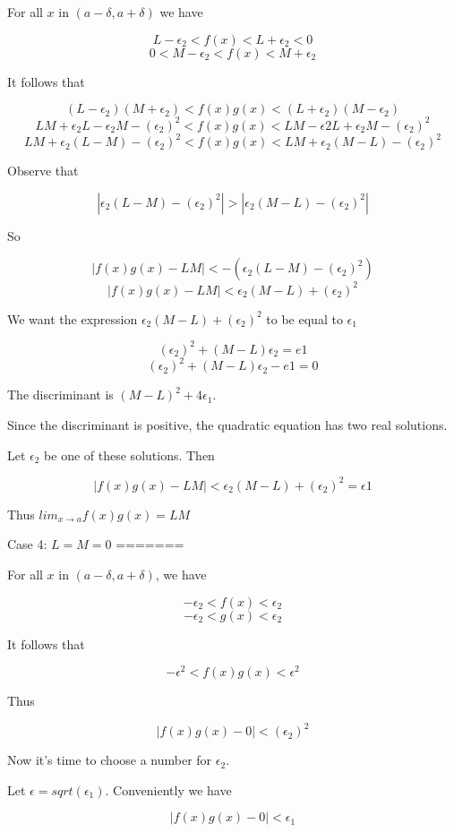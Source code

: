 For all $x$ in $(a - \delta, a + \delta)$ we have

    $$ L - \epsilon_2 < f(x) < L + \epsilon_2 < 0 $$
    $$ 0 < M - \epsilon_2 < f(x) < M + \epsilon_2 $$

It follows that

	$$ (L - \epsilon_2)(M + \epsilon_2) < f(x)g(x) < (L + \epsilon_2)(M - \epsilon_2) $$
	$$ LM + \epsilon_2L - \epsilon_2M - (\epsilon_2)^2 < f(x)g(x) < LM - \epsilon2L + \epsilon_2M - (\epsilon_2)^2 $$
	$$ LM + \epsilon_2(L - M) - (\epsilon_2)^2 < f(x)g(x) < LM + \epsilon_2(M - L) - (\epsilon_2)^2 $$

Observe that

    $$ |\epsilon_2(L - M) - (\epsilon_2)^2| > |\epsilon_2(M - L) - (\epsilon_2)^2| $$

So

    $$ |f(x)g(x) - LM| < -(\epsilon_2(L - M) - (\epsilon_2)^2) $$
    $$ |f(x)g(x) - LM| < \epsilon_2(M - L) + (\epsilon_2)^2 $$

We want the expression $\epsilon_2(M - L) + (\epsilon_2)^2$ to be equal to $\epsilon_1$

    $$ (\epsilon_2)^2 + (M - L)\epsilon_2 = e1 $$
    $$ (\epsilon_2)^2 + (M - L)\epsilon_2 - e1 = 0 $$

The discriminant is $(M - L)^2 + 4\epsilon_1$.

Since the discriminant is positive, the quadratic equation has two real solutions.

Let $\epsilon_2$ be one of these solutions. Then

    $$ |f(x)g(x) - LM| < \epsilon_2(M - L) + (\epsilon_2)^2 = \epsilon1 $$

Thus $lim_{x \rightarrow a} f(x)g(x) = LM$

Case 4: $L = M = 0$
=======

For all $x$ in $(a - \delta, a + \delta)$, we have

    $$ -\epsilon_2 < f(x) < \epsilon_2 $$
    $$ -\epsilon_2 < g(x) < \epsilon_2 $$

It follows that

    $$ -\epsilon^2 < f(x)g(x) < \epsilon^2 $$

Thus

    $$ |f(x)g(x) - 0| < (\epsilon_2)^2 $$

Now it's time to choose a number for $\epsilon_2$.

Let $\epsilon = sqrt(\epsilon_1)$. Conveniently we have

    $$ |f(x)g(x) - 0| < \epsilon_1 $$

